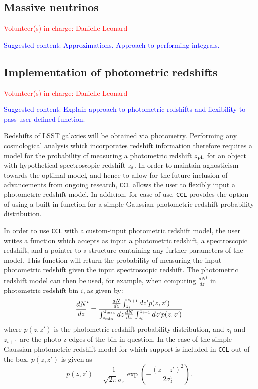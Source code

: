 \documentclass[\docopts]{\docclass}
\newcommand{\vol}[1]{\textcolor{red}{Volunteer(s) in charge: #1}}
\newcommand{\cont}[1]{\textcolor{blue}{Suggested content: #1}}
\newcommand{\ccl}{{\tt CCL}\xspace}
\begin{document}
\subsection{Massive neutrinos}
\vol{Danielle Leonard}

\cont{Approximations. Approach to performing integrals.}

\subsection{Implementation of photometric redshifts}
\vol{Danielle Leonard}

\cont{Explain approach to photometric redshifts and flexibility to pass user-defined function.}

Redshifts of LSST galaxies will be obtained via photometry. Performing any cosmological analysis which incorporates redshift information therefore requires a model for the probability of measuring a photometric redshift $z_{\rm ph}$ for an object with hypothetical spectroscopic redshift $z_{\rm s}$.  In order to maintain agnosticism towards the optimal model, and hence to allow for the future inclusion of advancements from ongoing research, \ccl allows the user to flexibly input a photometric redshift model. In addition, for ease of use, \ccl provides the option of using a built-in function for a simple Gaussian photometric redshift probability distribution.

In order to use \ccl with a custom-input photometric redshift model, the user writes a function which accepts as input a photometric redshift, a spectroscopic redshift, and a pointer to a structure containing any further parameters of the model. This function will return the probability of measuring the input photometric redshift given the input spectroscopic redshift. The photometric redshift model can then be used, for example, when computing $\frac{dN}{dz}^i$ in photometric redshift bin $i$, as given by:
\begin{equation}
\frac{dN}{dz}^i = \frac{\frac{dN}{dz}\int_{z_i}^{z_{i+1}} dz' p(z,z')}{\int_{z_{\rm min}}^{z_{\rm max}}dz \frac{dN}{dz} \int_{z_i}^{z_{i+1}}dz' p(z, z')}
\label{photoz}
\end{equation}
where $p(z,z')$ is the photometric redshift probability distribution, and $z_{i}$ and $z_{i+1}$ are the photo-z edges of the bin in question. In the case of the simple Gaussian photometric redshift model for which support is included in \ccl out of the box, $p(z, z')$ is given as
\begin{equation}
p(z,z') = \frac{1}{\sqrt{2 \pi}\sigma_z} \exp\left(-\frac{(z-z')^2}{2\sigma_z^2}\right).
\label{pz_gauss}
\end{equation}
\end{document}
